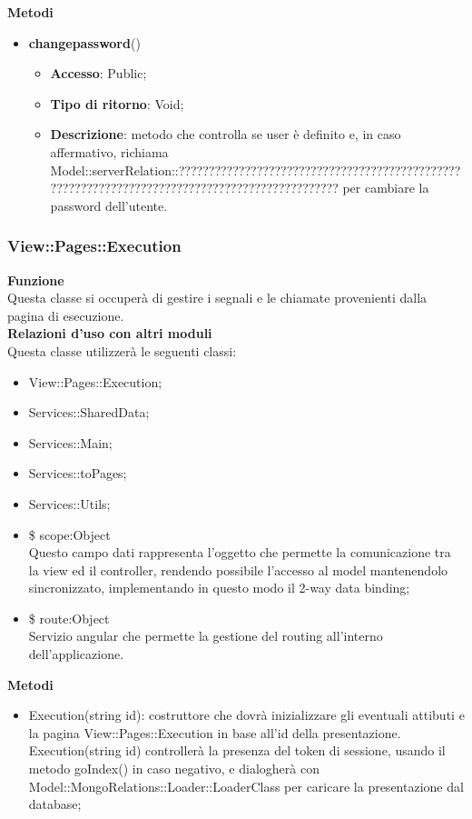 {{\begin{itemize}
    \end{itemize}
	\textbf{Metodi}
	\begin{itemize}
		\item \textbf{changepassword}()
		\begin{itemize}
			\item \textbf{Accesso}: Public;
			\item \textbf{Tipo di ritorno}: Void;
			\item \textbf{Descrizione}: metodo che controlla se user è definito e, in caso affermativo, richiama Model::\-serverRelation::\-??????????????????????????????????????????????????????????????????????????????????????????????? per cambiare la password dell'utente.
		\end{itemize}
	\end{itemize}
}
\subsubsection{View::Pages::Execution}{
	\textbf{Funzione}\\
	\indent Questa classe si occuperà di gestire i segnali e le chiamate provenienti dalla pagina di esecuzione.\\
	\textbf{Relazioni d'uso con altri moduli}\\
	\indent Questa classe utilizzerà le seguenti classi:
	\begin{itemize}
		\item View::Pages::Execution;
		\item Services::SharedData;
		\item Services::Main;
		\item Services::toPages;
		\item Services::Utils;
		\item \$ scope:Object\\
			\indent Questo campo dati rappresenta l’oggetto che permette la comunicazione tra la view ed il controller, rendendo possibile l’accesso al model mantenendolo sincronizzato, implementando in questo modo il 2-way data binding;
		\item \$ route:Object\\
			\indent Servizio angular che permette la gestione del routing all'interno dell'applicazione.
	\end{itemize}
	\textbf{Metodi}
	\begin{itemize}
		\item Execution(string id): costruttore che dovrà inizializzare gli eventuali attibuti e la pagina View::Pages::Execution in base all'id della presentazione. Execution(string id) controllerà la presenza del token di sessione, usando il metodo goIndex() in caso negativo, e dialogherà con Model::MongoRelations::Loader::LoaderClass per caricare la presentazione dal database;

\end{itemize}}}
